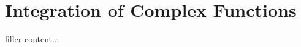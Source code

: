 \section{Integration of Complex Functions}\label{sec:integration-of-complex-functions}

filler content...


